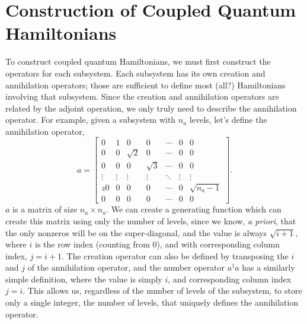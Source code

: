 \documentclass{article}
\begin{document}
\section{Construction of Coupled Quantum Hamiltonians}
To construct coupled quantum Hamiltonians, we must first construct the operators for each
subsystem. Each subsystem has its own creation and annihilation operators; those are sufficient
to define most (all?) Hamiltonians involving that subsystem. Since the creation and annihilation
operators are related by the adjoint operation, we only truly need to describe the annihilation
operator. For example, given a subsystem with $n_a$ levels, let's define the annihilation
operator,
\begin{equation}
  a = \begin{bmatrix}
    0 & 1 & 0 & 0 & \dotsm & 0 & 0\\
    0 & 0 & \sqrt{2} & 0 & \dotsm & 0 & 0\\
    0 & 0 & 0 & \sqrt{3} & \dotsm & 0 & 0\\
    \vdots & \vdots & \vdots & \vdots & \ddots & \vdots & \vdots \\z
    0 & 0 & 0 & 0 & \dotsm & 0 & \sqrt{n_a-1} \\
    0 & 0 & 0 & 0 & \dotsm & 0 & 0
    \end{bmatrix}.
\end{equation}
$a$ is a matrix of size $n_a \times n_a$. We can create a generating function which can
create this matrix using only the number of levels, since we know, {\em a priori},
that the only nonzeros will be on the super-diagonal, and the value is always
$\sqrt{i+1}$, where $i$ is the row index (counting from 0), and with corresponding column index,
$j=i+1$. The creation operator
can also be defined by transposing the $i$ and $j$ of the annihilation operator,
and the number operator $a^\dagger a$ has a similarly simple definition, where
the value is simply $i$, and corresponding column index $j=i$. This allows us, regardless of
the number of levels of the subsystem, to store only a single integer, the number of levels,
that uniquely defines the annihilation operator.
\end{document}
